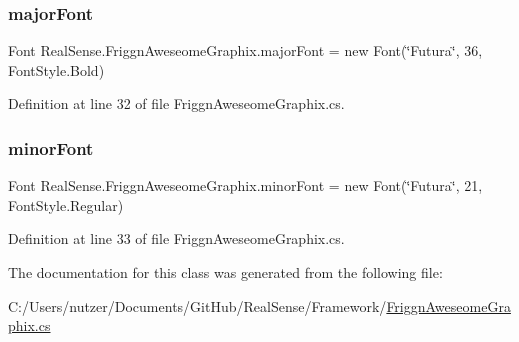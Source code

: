 \subsubsection{\texorpdfstring{major\+Font}{majorFont}}
{\footnotesize\ttfamily Font Real\+Sense.\+Friggn\+Aweseome\+Graphix.\+major\+Font = new Font(\char`\"{}Futura\char`\"{}, 36, Font\+Style.\+Bold)\hspace{0.3cm}{\ttfamily [static]}}



Definition at line 32 of file Friggn\+Aweseome\+Graphix.\+cs.

\mbox{\label{class_real_sense_1_1_friggn_aweseome_graphix_a9d2afacf158345fcecf1b25b895806a2}} 
\subsubsection{\texorpdfstring{minor\+Font}{minorFont}}
{\footnotesize\ttfamily Font Real\+Sense.\+Friggn\+Aweseome\+Graphix.\+minor\+Font = new Font(\char`\"{}Futura\char`\"{}, 21, Font\+Style.\+Regular)\hspace{0.3cm}{\ttfamily [static]}}



Definition at line 33 of file Friggn\+Aweseome\+Graphix.\+cs.



The documentation for this class was generated from the following file\+:\begin{DoxyCompactItemize}
\item 
C\+:/\+Users/nutzer/\+Documents/\+Git\+Hub/\+Real\+Sense/\+Framework/\hyperlink{_friggn_aweseome_graphix_8cs}{Friggn\+Aweseome\+Graphix.\+cs}\end{DoxyCompactItemize}
